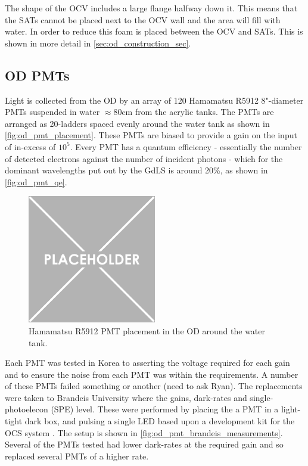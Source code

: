 \par
The shape of the OCV includes a large flange halfway down it. 
This means that the SATs cannot be placed next to the OCV wall and the area will fill with water.
In order to reduce this foam is placed between the OCV and SATs.
This is shown in more detail in \autoref{sec:od_construction_sec}.

\subsection{OD PMTs}
\par
Light is collected from the OD by an array of 120 Hamamatsu R5912 8"-diameter PMTs suspended in water $\approx$80cm from the acrylic tanks.
The PMTs are arranged as 20-ladders spaced evenly around the water tank as shown in \autoref{fig:od_pmt_placement}.
These PMTs are biased to provide a gain on the input of in-excess of $10^{5}$.
Every PMT has a quantum efficiency - essentially the number of detected electrons against the number of incident photons - which for the dominant wavelengths put out by the GdLS is around 20\%, as shown in \autoref{fig:od_pmt_qe}.

\begin{figure}
    \centering
    \includegraphics[width=0.5\textwidth]{Figures/Placeholder.png}
    \caption{Hamamatsu R5912 PMT placement in the OD around the water tank.}
    \label{fig:od_pmt_placement}
\end{figure}




\par
Each PMT was tested in Korea to asserting the voltage required for each gain and to ensure the noise from each PMT was within the requirements.
A number of these PMTs failed something or another (need to ask Ryan).
The replacements were taken to Brandeis University where the gains, dark-rates and single-photoelecon (SPE) level.
These were performed by placing the a PMT in a light-tight dark box, and pulsing a single LED based upon a development kit for the OCS system \cite{lz_ocs_system_ref}.
The setup is shown in \autoref{fig:od_pmt_brandeis_measurements}.
Several of the PMTs tested had lower dark-rates at the required gain and so replaced several PMTs of a higher rate.

